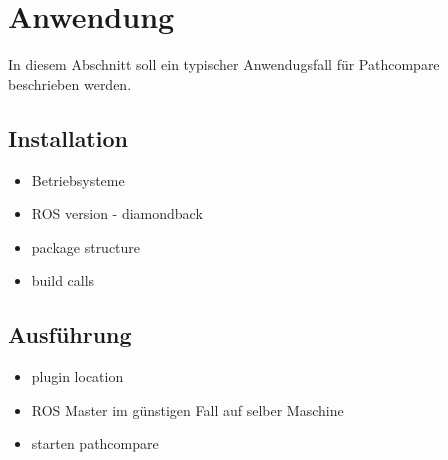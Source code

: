 \chapter{Anwendung}
\label{sec:andwendung}
In diesem Abschnitt soll ein typischer Anwendugsfall für Pathcompare
beschrieben werden. 

\section{Installation}

\begin{itemize}
  \item Betriebsysteme
  \item ROS version - diamondback
  \item package structure
  \item build calls
\end{itemize}

\section{Ausführung}
\begin{itemize}
  \item plugin location
  \item ROS Master im günstigen Fall auf selber Maschine
  \item starten pathcompare
\end{itemize}
